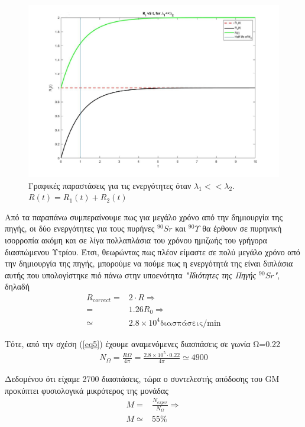 \documentclass[a4paper]{article}
\begin{document}
	\begin{figure}[h!]
		\centering
		\includegraphics[scale=0.45]{R(t)}
		\caption{Γραφικές παραστάσεις για τις ενεργότητες όταν $\lambda_1<<\lambda_2$. \\
	$R(t) = R_1(t) + R_2(t)$}
		\label{fig2}
	\end{figure}
	
	Από τα παραπάνω συμπεραίνουμε πως για μεγάλο χρόνο από την δημιουργία της πηγής, οι δύο ενεργότητες για τους πυρήνες $^{90}Sr$ και $^{90}Υ$ θα έρθουν σε πυρηνική ισορροπία ακόμη και σε λίγα πολλαπλάσια του χρόνου ημιζωής του γρήγορα διασπώμενου Υτρίου. Έτσι, θεωρώντας πως πλέον είμαστε σε πολύ μεγάλο χρόνο από την δημιουργία της πηγής, μπορούμε να πούμε πως η ενεργότητά της είναι διπλάσια αυτής που υπολογίστηκε πιό πάνω στην υποενότητα \textit{"Ιδιότητες της Πηγής $^{90}Sr$"}, δηλαδή 
	\begin{align*}
			R_{correct} =&  2\cdot R \Rightarrow \\
						=& 1.26R_0\Rightarrow\\
				   \simeq& 2.8\times 10^4 \text{διασπάσεις/min}
	\end{align*}
	
	Τότε, από την σχέση (\ref{eq5}) έχουμε αναμενόμενες διασπάσεις σε γωνία Ω=0.22
		\begin{align*}
			N_\Omega = \frac{R\Omega}{4\pi} =\frac{2.8\times10^5\cdot0.22}{4\pi} \simeq 4900
		\end{align*}
		
	Δεδομένου ότι είχαμε 2700 διασπάσεις, τώρα ο συντελεστής απόδοσης του GM προκύπτει φυσιολογικά μικρότερος της μονάδας
	\begin{align*}
		M =& \frac{N_{exper}}{N_\Omega} \Rightarrow\\
		M \simeq&55\% 
	\end{align*}
	\\
\end{document}
